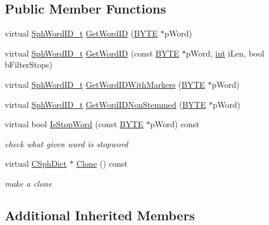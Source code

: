 \subsection*{Public Member Functions}
\begin{DoxyCompactItemize}
\item 
virtual \hyperlink{sphinx_8h_a80a94d5984fdf9214a98f3e5e65df963}{Sph\-Word\-I\-D\-\_\-t} \hyperlink{structCSphDictTemplate_ad5b7b1a178e136fa090e2d5b39ec31d1}{Get\-Word\-I\-D} (\hyperlink{sphinxstd_8h_a4ae1dab0fb4b072a66584546209e7d58}{B\-Y\-T\-E} $\ast$p\-Word)
\item 
virtual \hyperlink{sphinx_8h_a80a94d5984fdf9214a98f3e5e65df963}{Sph\-Word\-I\-D\-\_\-t} \hyperlink{structCSphDictTemplate_a2c7cdf00730fdb30bff84c553a2579ee}{Get\-Word\-I\-D} (const \hyperlink{sphinxstd_8h_a4ae1dab0fb4b072a66584546209e7d58}{B\-Y\-T\-E} $\ast$p\-Word, \hyperlink{sphinxexpr_8cpp_a4a26e8f9cb8b736e0c4cbf4d16de985e}{int} i\-Len, bool b\-Filter\-Stops)
\item 
virtual \hyperlink{sphinx_8h_a80a94d5984fdf9214a98f3e5e65df963}{Sph\-Word\-I\-D\-\_\-t} \hyperlink{structCSphDictTemplate_ac4be906ecdf1836e25fb2c60fe793d57}{Get\-Word\-I\-D\-With\-Markers} (\hyperlink{sphinxstd_8h_a4ae1dab0fb4b072a66584546209e7d58}{B\-Y\-T\-E} $\ast$p\-Word)
\item 
virtual \hyperlink{sphinx_8h_a80a94d5984fdf9214a98f3e5e65df963}{Sph\-Word\-I\-D\-\_\-t} \hyperlink{structCSphDictTemplate_a831f0dbee698ca7ec1151ab7f60d0d92}{Get\-Word\-I\-D\-Non\-Stemmed} (\hyperlink{sphinxstd_8h_a4ae1dab0fb4b072a66584546209e7d58}{B\-Y\-T\-E} $\ast$p\-Word)
\item 
virtual bool \hyperlink{structCSphDictTemplate_aacf98e88e774cb20df7ec3930f7d6f10}{Is\-Stop\-Word} (const \hyperlink{sphinxstd_8h_a4ae1dab0fb4b072a66584546209e7d58}{B\-Y\-T\-E} $\ast$p\-Word) const 
\begin{DoxyCompactList}\small\item\em check what given word is stopword \end{DoxyCompactList}\item 
virtual \hyperlink{classCSphDict}{C\-Sph\-Dict} $\ast$ \hyperlink{structCSphDictTemplate_aea69a1dc73dc3cf588b7c4c371a3825e}{Clone} () const 
\begin{DoxyCompactList}\small\item\em make a clone \end{DoxyCompactList}\end{DoxyCompactItemize}
\subsection*{Additional Inherited Members}


